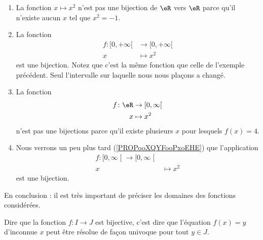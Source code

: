 \begin{example}     \label{EXooCWYHooLEciVj}
    \begin{enumerate}
        \item
            La fonction \( x\mapsto x^2\) n'est pas une bijection de \( \eR\) vers \( \eR\) parce qu'il n'existe aucun \( x\) tel que \( x^2=-1\).
        \item
            La fonction
            \begin{equation}
                \begin{aligned}
                    f\colon \mathopen[ 0 , +\infty [&\to \mathopen[ 0 , +\infty [ \\
                    x&\mapsto x^2
                \end{aligned}
            \end{equation}
            est une bijection. Notez que c'est la même fonction que celle de l'exemple précédent. Seul l'intervalle sur laquelle nous nous plaçons a changé.
        \item
            La fonction
            \begin{equation}
                \begin{aligned}
                    f\colon \eR&\to \mathopen[ 0 , \infty \mathclose[ \\
                    x&\mapsto x^2
                \end{aligned}
            \end{equation}
            n'est pas une bijections parce qu'il existe plusieurs \( x\) pour lesquels \( f(x)=4\).
        \item
            Nous verrons un peu plus tard (\ref{PROPooXQYFooPxoEHE}) que l'application
            \begin{equation}
                \begin{aligned}
                    f\colon \mathopen[ 0 , \infty \mathclose[\to \mathopen[ 0 , \infty \mathclose[\\
                    x&\mapsto x^2
                \end{aligned}
            \end{equation}
            est une bijection.
    \end{enumerate}
    En conclusion : il est très important de préciser les domaines des fonctions considérées.
\end{example}

\begin{remark}
    Dire que la fonction \( f\colon I\to J\) est bijective, c'est dire que l'équation \( f(x)=y\) d'inconnue \( x\) peut être résolue de façon univoque pour tout \( y\in J\).
\end{remark}

